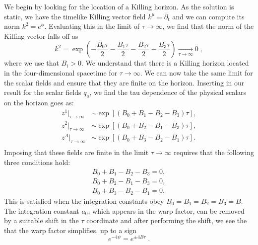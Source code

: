 We begin by looking for the location of a Killing horizon. As the solution is static, we have the timelike Killing vector field $k^\mu = \partial_t$ and we can compute its norm $k^2 = e^\phi$. Evaluating this in the limit of $\tau \rightarrow \infty$, we find that the norm of the Killing vector falls off as
\begin{equation*}
	k^2 = \exp \left(-\frac{B_0 \tau}{2} -\frac{B_1 \tau}{2} -\frac{B_2 \tau}{2} -\frac{B_3 \tau}{2} \right) \xrightarrow[\tau \rightarrow \infty]{}0 \;,
\end{equation*}
where we use that $B_i > 0$. We understand that there is a Killing horizon located in the four-dimensional spacetime for $\tau \rightarrow \infty$. We can now take the same limit for the scalar fields  and ensure that they are finite on the horizon. Inserting in our result for the scalar fields $q_a$, we find the tau dependence of the physical scalars on the horizon goes as:
\begin{equation*}
  \begin{aligned}
  z^1 \big|_{\tau \rightarrow \infty} &\sim \exp \left[ \left(B_0 + B_1 - B_2  - B_3 \right)\tau \right] ,\\
   z^2 \big|_{\tau \rightarrow \infty} &\sim \exp \left[ \left(B_0 + B_2 - B_1 - B_3 \right)\tau \right] ,\\
  z^A \big|_{\tau \rightarrow \infty} &\sim \exp \left[ \left( B_0 + B_3 - B_2 - B_1 \right)\tau \right] .\\
  \end{aligned}
\end{equation*}
Imposing that these fields are finite in the limit $\tau \rightarrow \infty$ requires that the following three conditions hold:
\begin{equation*}
  \begin{aligned}
      B_0 + B_1 - B_2 - B_3 = 0 ,\\
        B_0 + B_2 - B_1 - B_3 = 0 ,\\
         B_0 + B_3 - B_2 - B_1 = 0 .
  \end{aligned}
\end{equation*}
This is satisfied when the integration constants obey $B_0 = B_1 = B_2 = B_3 = B$. The integration constant $a_0$, which appears in the warp factor, can be removed by a suitable shift in the $\tau$ coordinate and after performing the shift, we see the that the warp factor simplifies, up to a sign
\begin{equation*}
    e^{-4\psi} = e^{\pm 4 B \tau} \; .
\end{equation*}
